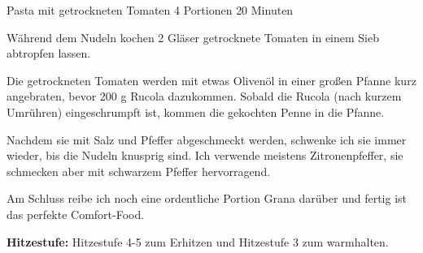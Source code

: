 \begin{recipe}{Pasta mit getrockneten Tomaten} {4 Portionen} {20 Minuten}

  \freeform
  \textit{}
  
  
  Während dem Nudeln kochen 2 Gläser getrocknete Tomaten in einem Sieb abtropfen lassen.

  Die getrockneten Tomaten werden mit etwas Olivenöl in einer großen Pfanne kurz angebraten, bevor 200 g Rucola dazukommen.
  Sobald die Rucola (nach kurzem Umrühren) eingeschrumpft ist, kommen die gekochten Penne in die Pfanne.
  
  Nachdem sie mit Salz und Pfeffer abgeschmeckt werden, schwenke ich sie immer wieder, bis die Nudeln knusprig sind.
  Ich verwende meistens Zitronenpfeffer, sie schmecken aber mit schwarzem Pfeffer hervorragend.
  
  Am Schluss reibe ich noch eine ordentliche Portion Grana darüber und fertig ist das perfekte Comfort-Food.
  
  \freeform
  \hrulefill
  
  \freeform
  \textbf{Hitzestufe:}
  Hitzestufe 4-5 zum Erhitzen und Hitzestufe 3 zum warmhalten.
  
  \end{recipe}
  